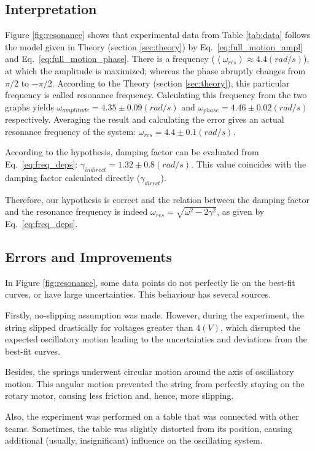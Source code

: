 \subsection{Interpretation}
Figure \ref{fig:resonance} shows that experimental data from Table \ref{tab:data} follows the model given in Theory (section \ref{sec:theory}) by Eq.~\eqref{eq:full_motion_ampl} and Eq.~\eqref{eq:full_motion_phase}. There is a frequency ($\left< \omega_{res} \right> \approx 4.4 (rad/s)$), at which the amplitude is maximized; whereas the phase abruptly changes from $\pi/2$ to $-\pi/2$. According to the Theory (section \ref{sec:theory}), this particular frequency is called resonance frequency. Calculating this frequency from the two graphs yields $\omega_{amplitude} = 4.35 \pm 0.09 (rad/s)$ and $\omega_{phase} = 4.46 \pm 0.02 (rad/s)$ respectively. Averaging the result and calculating the error gives an actual resonance frequency of the system: $\omega_{res} = 4.4 \pm 0.1 (rad/s)$.

According to the hypothesis, damping factor can be evaluated from Eq.~\eqref{eq:freq_deps}: $\gamma_{indirect} = 1.32 \pm 0.8 (rad/s)$. This value coincides with the damping factor calculated directly ($\gamma_{direct}$).

Therefore, our hypothesis is correct and the relation between the damping factor and the resonance frequency is indeed $\omega_{res} = \sqrt{\omega^2 - 2\gamma^2}$, as given by Eq.~\eqref{eq:freq_deps}.

\subsection{Errors and Improvements}

In Figure \ref{fig:resonance}, some data points do not perfectly lie on the best-fit curves, or have large uncertainties. This behaviour has several sources.

Firstly, no-slipping assumption was made. However, during the experiment, the string slipped drastically for voltages greater than $4 (V)$, which disrupted the expected oscillatory motion leading to the uncertainties and deviations from the best-fit curves.

Besides, the springs underwent circular motion around the axis of oscillatory motion. This angular motion prevented the string from perfectly staying on the rotary motor, causing less friction and, hence, more slipping.

Also, the experiment was performed on a table that was connected with other teams. Sometimes, the table was slightly distorted from its position, causing additional (usually, insignificant) influence on the oscillating system.

